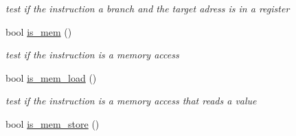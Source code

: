 \begin{DoxyCompactItemize}
\begin{DoxyCompactList}\small\item\em test if the instruction a branch and the target adress is in a register \end{DoxyCompactList}\item 
\hypertarget{class_instruction_a1c79865faf9baa4d70edf81e956d952d}{bool \hyperlink{class_instruction_a1c79865faf9baa4d70edf81e956d952d}{is\+\_\+mem} ()}\label{class_instruction_a1c79865faf9baa4d70edf81e956d952d}

\begin{DoxyCompactList}\small\item\em test if the instruction is a memory access \end{DoxyCompactList}\item 
\hypertarget{class_instruction_aee32f4bb91480afc74375beb139af4d6}{bool \hyperlink{class_instruction_aee32f4bb91480afc74375beb139af4d6}{is\+\_\+mem\+\_\+load} ()}\label{class_instruction_aee32f4bb91480afc74375beb139af4d6}

\begin{DoxyCompactList}\small\item\em test if the instruction is a memory access that reads a value \end{DoxyCompactList}\item 
\hypertarget{class_instruction_a4455144397d239eb61bcfa2b0e16bf67}{bool \hyperlink{class_instruction_a4455144397d239eb61bcfa2b0e16bf67}{is\+\_\+mem\+\_\+store} ()}\label{class_instruction_a4455144397d239eb61bcfa2b0e16bf67}


\end{DoxyCompactItemize}
